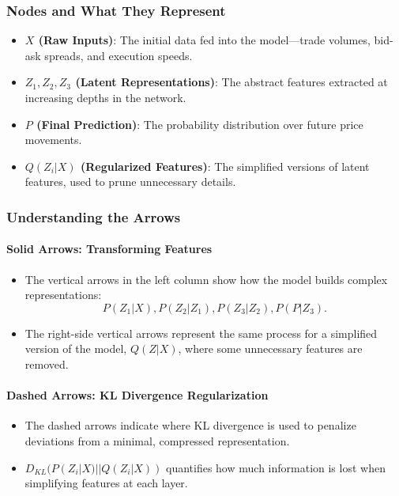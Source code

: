 \subsubsection*{Nodes and What They Represent}

\begin{itemize}
    \item \textbf{\( X \) (Raw Inputs)}: The initial data fed into the model—trade volumes, bid-ask spreads, and execution speeds.
    \item \textbf{\( Z_1, Z_2, Z_3 \) (Latent Representations)}: The abstract features extracted at increasing depths in the network. 
    \item \textbf{\( P \) (Final Prediction)}: The probability distribution over future price movements.
    \item \textbf{\( Q(Z_i | X) \) (Regularized Features)}: The simplified versions of latent features, used to prune unnecessary details.
\end{itemize}

\subsubsection*{Understanding the Arrows}

\paragraph{Solid Arrows: Transforming Features}
\begin{itemize}
    \item The vertical arrows in the left column show how the model builds complex representations:
        \[
        P(Z_1 | X), P(Z_2 | Z_1), P(Z_3 | Z_2), P(P | Z_3).
        \]
    \item The right-side vertical arrows represent the same process for a simplified version of the model, \( Q(Z | X) \), where some unnecessary features are removed.
\end{itemize}

\paragraph{Dashed Arrows: KL Divergence Regularization}
\begin{itemize}
    \item The dashed arrows indicate where KL divergence is used to penalize deviations from a minimal, compressed representation.
    \item \( D_{KL}(P(Z_i | X) || Q(Z_i | X)) \) quantifies how much information is lost when simplifying features at each layer.
\end{itemize}

